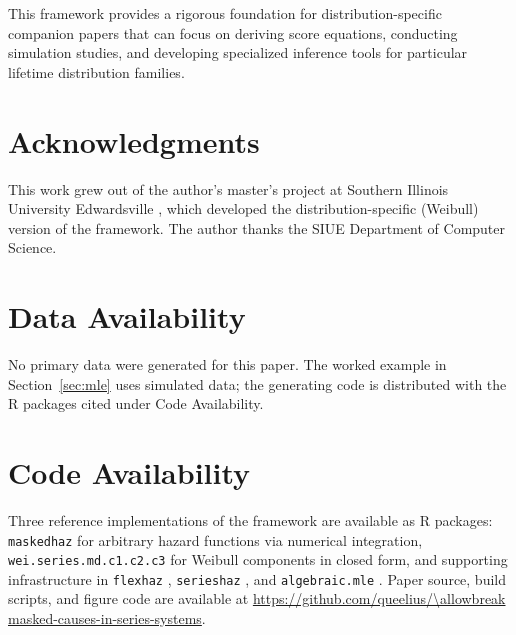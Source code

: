 \documentclass[11pt]{article}
\theoremstyle{definition}
\theoremstyle{plain}
\begin{document}
This framework provides a rigorous foundation for distribution-specific
companion papers that can focus on deriving score equations, conducting
simulation studies, and developing specialized inference tools for
particular lifetime distribution families.

\section*{Acknowledgments}

This work grew out of the author's master's project at Southern
Illinois University Edwardsville
\citep{towell2023masters}, which developed the
distribution-specific (Weibull) version of the framework.
The author thanks the SIUE Department of Computer Science.

\section*{Data Availability}

No primary data were generated for this paper. The worked example in
Section~\ref{sec:mle} uses simulated data; the generating code is
distributed with the R packages cited under Code Availability.

\section*{Code Availability}

Three reference implementations of the framework are available as
R packages: \texttt{maskedhaz} \citep{towell2025maskedhaz} for
arbitrary hazard functions via numerical integration,
\texttt{wei.series.md.c1.c2.c3} \citep{towell2023weibull} for
Weibull components in closed form, and supporting infrastructure
in \texttt{flexhaz} \citep{towell2025flexhaz},
\texttt{serieshaz} \citep{towell2025serieshaz}, and
\texttt{algebraic.mle} \citep{towell2023algebraic-mle}. Paper
source, build scripts, and figure code are available at
\url{https://github.com/queelius/\allowbreak masked-causes-in-series-systems}.
\end{document}
